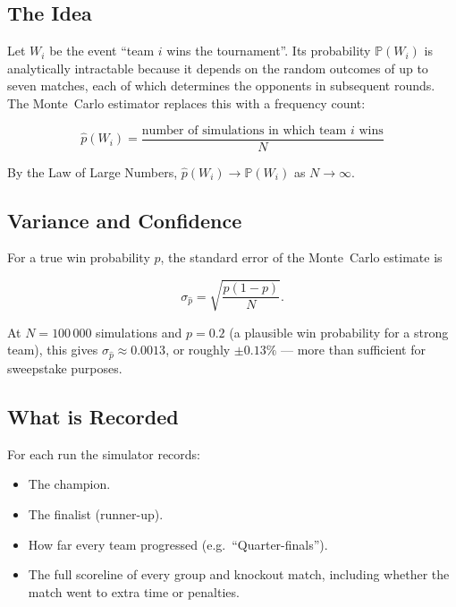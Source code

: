 \documentclass[12pt,a4paper]{article}
\newcommand{\Prob}{\mathbb{P}}
\begin{document}
\subsection{The Idea}

Let $W_i$ be the event ``team $i$ wins the tournament''.  Its probability
$\Prob(W_i)$ is analytically intractable because it depends on the
random outcomes of up to seven matches, each of which determines the
opponents in subsequent rounds.  The Monte~Carlo estimator replaces this
with a frequency count:

\begin{equation}
  \hat{p}(W_i) = \frac{\text{number of simulations in which team } i
  \text{ wins}}{N}
  \label{eq:mc}
\end{equation}

By the Law of Large Numbers, $\hat{p}(W_i) \to \Prob(W_i)$ as
$N \to \infty$.

\subsection{Variance and Confidence}

For a true win probability $p$, the standard error of the Monte~Carlo
estimate is

\begin{equation}
  \sigma_{\hat{p}} = \sqrt{\frac{p(1-p)}{N}}.
\end{equation}

At $N = 100\,000$ simulations and $p = 0.2$ (a plausible win probability
for a strong team), this gives $\sigma_{\hat{p}} \approx 0.0013$, or
roughly $\pm 0.13\%$ --- more than sufficient for sweepstake purposes.

\subsection{What is Recorded}

For each run the simulator records:

\begin{itemize}[noitemsep]
  \item The champion.
  \item The finalist (runner-up).
  \item How far every team progressed (e.g.\ ``Quarter-finals'').
  \item The full scoreline of every group and knockout match, including
        whether the match went to extra time or penalties.
\end{itemize}
\end{document}
